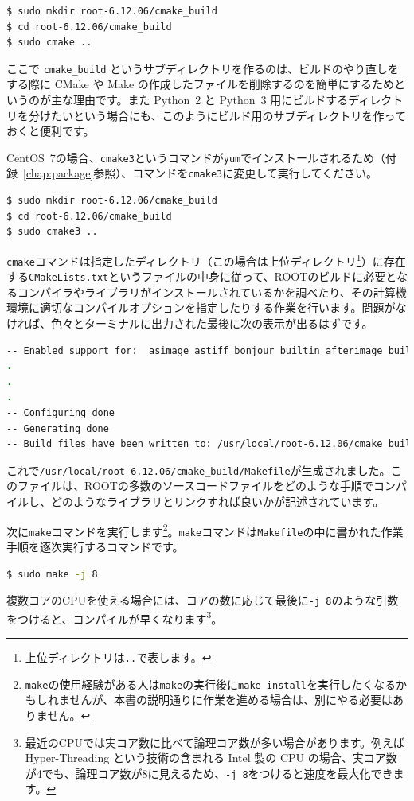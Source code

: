 \begin{lstlisting}[language=bash]
$ sudo mkdir root-6.12.06/cmake_build
$ cd root-6.12.06/cmake_build
$ sudo cmake ..
\end{lstlisting}

ここで \texttt{cmake\_build} というサブディレクトリを作るのは、ビルドのやり直しをする際に CMake や Make の作成したファイルを削除するのを簡単にするためというのが主な理由です。また Python~2 と Python~3 用にビルドするディレクトリを分けたいという場合にも、このようにビルド用のサブディレクトリを作っておくと便利です。

CentOS~7の場合、\texttt{cmake3}というコマンドが\texttt{yum}でインストールされるため（付録~\ref{chap:package}参照）、コマンドを\texttt{cmake3}に変更して実行してください。

\begin{lstlisting}[language=bash]
$ sudo mkdir root-6.12.06/cmake_build
$ cd root-6.12.06/cmake_build
$ sudo cmake3 ..
\end{lstlisting}

\texttt{cmake}コマンドは指定したディレクトリ（この場合は上位ディレクトリ\footnote{上位ディレクトリは\texttt{..}で表します。}）に存在する\texttt{CMakeLists.txt}というファイルの中身に従って、ROOTのビルドに必要となるコンパイラやライブラリがインストールされているかを調べたり、その計算機環境に適切なコンパイルオプションを指定したりする作業を行います。問題がなければ、色々とターミナルに出力された最後に次の表示が出るはずです。
\begin{lstlisting}[language=bash]
-- Enabled support for:  asimage astiff bonjour builtin_afterimage builtin_ftgl builtin_freetype builtin_gl2ps builtin_glew builtin_unuran builtin_llvm cxx11 cling cocoa exceptions explicitlink fitsio fortran gviz genvector krb5 ldap memstat opengl pch python shared sqlite thread tmva vdt xml
.
.
.
-- Configuring done
-- Generating done
-- Build files have been written to: /usr/local/root-6.12.06/cmake_build
\end{lstlisting}

これで\texttt{/usr/local/root-6.12.06/cmake\_build/Makefile}が生成されました。このファイルは、ROOTの多数のソースコードファイルをどのような手順でコンパイルし、どのようなライブラリとリンクすれば良いかが記述されています。

次に\texttt{make}コマンドを実行します\footnote{\texttt{make}の使用経験がある人は\texttt{make}の実行後に\texttt{make install}を実行したくなるかもしれませんが、本書の説明通りに作業を進める場合は、別にやる必要はありません。}。\texttt{make}コマンドは\texttt{Makefile}の中に書かれた作業手順を逐次実行するコマンドです。
\begin{lstlisting}[language=bash]
$ sudo make -j 8
\end{lstlisting}
複数コアのCPUを使える場合には、コアの数に応じて最後に\texttt{-j 8}のような引数をつけると、コンパイルが早くなります\footnote{最近のCPUでは実コア数に比べて論理コア数が多い場合があります。例えば Hyper-Threading という技術の含まれる Intel 製の CPU の場合、実コア数が4でも、論理コア数が8に見えるため、\texttt{-j 8}をつけると速度を最大化できます。}。

